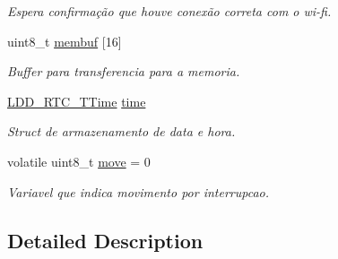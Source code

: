 \begin{DoxyCompactItemize}
\begin{DoxyCompactList}\small\item\em Espera confirmação que houve conexão correta com o wi-\/fi. \end{DoxyCompactList}\item 
\hypertarget{group__main__module_ga78cbc313be4144b94e7f85d58a3496eb}{uint8\-\_\-t \hyperlink{group__main__module_ga78cbc313be4144b94e7f85d58a3496eb}{membuf} \mbox{[}16\mbox{]}}\label{group__main__module_ga78cbc313be4144b94e7f85d58a3496eb}

\begin{DoxyCompactList}\small\item\em Buffer para transferencia para a memoria. \end{DoxyCompactList}\item 
\hypertarget{group__main__module_ga18fd04fdadfae991704e8d58a0e0ae8e}{\hyperlink{struct_l_d_d___r_t_c___t_time}{L\-D\-D\-\_\-\-R\-T\-C\-\_\-\-T\-Time} \hyperlink{group__main__module_ga18fd04fdadfae991704e8d58a0e0ae8e}{time}}\label{group__main__module_ga18fd04fdadfae991704e8d58a0e0ae8e}

\begin{DoxyCompactList}\small\item\em Struct de armazenamento de data e hora. \end{DoxyCompactList}\item 
volatile uint8\-\_\-t \hyperlink{group__main__module_ga3ec3246b6885ab76d880359df143c477}{move} = 0
\begin{DoxyCompactList}\small\item\em Variavel que indica movimento por interrupcao. \end{DoxyCompactList}\end{DoxyCompactItemize}


\subsection{Detailed Description}


